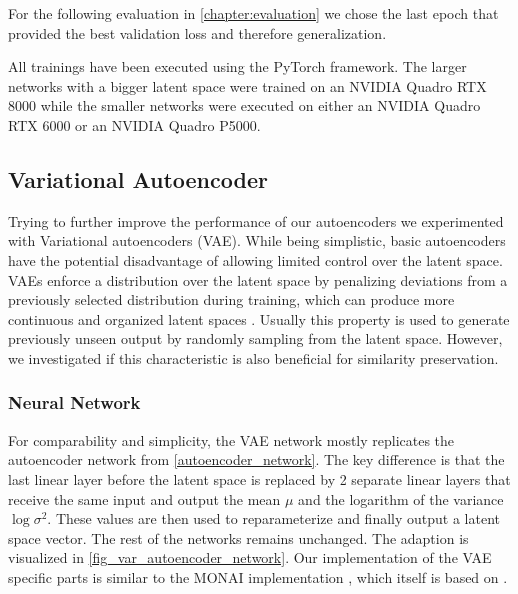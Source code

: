 For the following evaluation in \autoref{chapter:evaluation} we chose the last epoch that provided the best validation loss and therefore generalization.

All trainings have been executed using the PyTorch framework. The larger networks with a bigger latent space were trained on an NVIDIA Quadro RTX 8000 while the smaller networks were executed on either an NVIDIA Quadro RTX 6000 or an NVIDIA Quadro P5000.




\subsection{Variational Autoencoder}
Trying to further improve the performance of our autoencoders we experimented with Variational autoencoders (VAE). While being simplistic, basic autoencoders have the potential disadvantage of allowing limited control over the latent space. VAEs enforce a distribution over the latent space by penalizing deviations from a previously selected distribution during training, which can produce more continuous and organized latent spaces . Usually this property is used to generate previously unseen output by randomly sampling from the latent space. However, we investigated if this characteristic is also beneficial for similarity preservation.
\subsubsection{Neural Network}
For comparability and simplicity, the VAE network mostly replicates the autoencoder network from \autoref{autoencoder_network}. The key difference is that the last linear layer before the latent space is replaced by 2 separate linear layers that receive the same input and output the mean $\mu$ and the logarithm of the variance $\log{\sigma^2}$. These values are then used to reparameterize and finally output a latent space vector. The rest of the networks remains unchanged. The adaption is visualized in \autoref{fig_var_autoencoder_network}. Our implementation of the VAE specific parts is similar to the MONAI implementation \parencite{The_MONAI_Consortium2020-ns}, which itself is based on \parencite{Kingma2013}.

